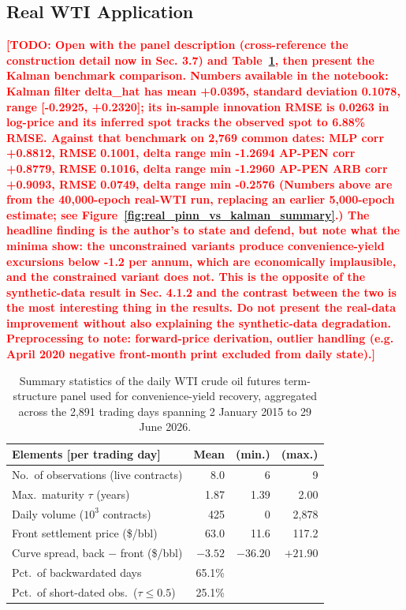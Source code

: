 \documentclass[11pt, a4paper]{article}
\newcommand{\todo}[1]{\textcolor{red}{\textbf{[TODO: #1]}}}
\begin{document}
\subsection{Real WTI Application}
\label{sec:real_data}

\todo{Open with the panel description (cross-reference the construction detail
  now in Sec. 3.7) and Table~\ref{tab:data_stats}, then present the Kalman
  benchmark comparison. Numbers available in the notebook:
  Kalman filter delta\_hat has mean +0.0395, standard deviation 0.1078, range
  [-0.2925, +0.2320]; its in-sample innovation RMSE is 0.0263 in log-price and
  its inferred spot tracks the observed spot to 6.88\% RMSE.
  Against that benchmark on 2,769 common dates:
    MLP        corr +0.8812, RMSE 0.1001, delta range min -1.2694
    AP-PEN    corr +0.8779, RMSE 0.1016, delta range min -1.2960
    AP-PEN ARB corr +0.9093, RMSE 0.0749, delta range min -0.2576
  (Numbers above are from the 40{,}000-epoch real-WTI run, replacing an earlier
  5{,}000-epoch estimate; see Figure~\ref{fig:real_pinn_vs_kalman_summary}.)
  The headline finding is the author's to state and defend, but note what the
  minima show: the unconstrained variants produce convenience-yield excursions
  below -1.2 per annum, which are economically implausible, and the constrained
  variant does not. This is the opposite of the synthetic-data result in
  Sec. 4.1.2 and the contrast between the two is the most interesting thing in
  the results. Do not present the real-data improvement without also explaining
  the synthetic-data degradation.
  Preprocessing to note: forward-price derivation, outlier handling
  (e.g. April 2020 negative front-month print excluded from daily state).}




\begin{table}[h!]
\centering
\caption{Summary statistics of the daily WTI crude oil futures
term-structure panel used for convenience-yield recovery, aggregated
across the 2{,}891 trading days spanning 2 January 2015 to 29 June 2026.}
\label{tab:data_stats}
\begin{tabular}{@{}lrrr@{}}
\toprule
Elements [per trading day] & Mean & {\footnotesize(min.)} & {\footnotesize(max.)} \\
\midrule
No.\ of observations (live contracts) & 8.0   & 6      & 9      \\
Max.\ maturity $\tau$ (years)         & 1.87  & 1.39   & 2.00   \\
Daily volume ($10^3$ contracts)       & 425   & 0      & 2{,}878 \\
Front settlement price (\$/bbl)       & 63.0  & 11.6   & 117.2  \\
Curve spread, back $-$ front (\$/bbl) & $-3.52$ & $-36.20$ & $+21.90$ \\
Pct.\ of backwardated days            & 65.1\% &        &        \\
Pct.\ of short-dated obs.\ ($\tau \leq 0.5$) & 25.1\% & &  \\
\bottomrule
\end{tabular}
\end{table}
\end{document}

